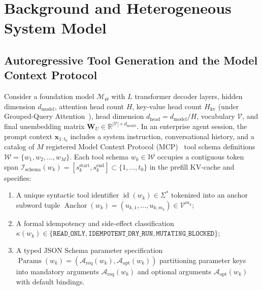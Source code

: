 \documentclass[10pt,conference]{IEEEtran}
\begin{document}
\section{Background and Heterogeneous System Model}
\label{sec:background}

\subsection{Autoregressive Tool Generation and the Model Context Protocol}
Consider a foundation model $\mathcal{M}_\Theta$ with $L$ transformer decoder layers, hidden dimension $d_{\text{model}}$, attention head count $H$, key-value head count $H_{\text{kv}}$ (under Grouped-Query Attention~\cite{vaswani2017attention, dao2022flashattention, dao2024flashattention2}), head dimension $d_{\text{head}} = d_{\text{model}} / H$, vocabulary $\mathcal{V}$, and final unembedding matrix $\mathbf{W}_U \in \mathbb{R}^{|\mathcal{V}| \times d_{\text{model}}}$. In an enterprise agent session, the prompt context $\mathbf{x}_{1:t_0}$ includes a system instruction, conversational history, and a catalog of $M$ registered Model Context Protocol (MCP)~\cite{anthropic2024mcp, lumer2025scalemcp, gan2025ragmcp} tool schema definitions $\mathcal{W} = \{w_1, w_2, \dots, w_M\}$. Each tool schema $w_k \in \mathcal{W}$ occupies a contiguous token span $\mathcal{I}_{\text{schema}}(w_k) = [s_k^{\text{start}}, s_k^{\text{end}}] \subset \{1, \dots, t_0\}$ in the prefill KV-cache and specifies:
\begin{enumerate}
    \item A unique syntactic tool identifier $\operatorname{id}(w_k) \in \Sigma^*$ tokenized into an anchor subword tuple $\operatorname{Anchor}(w_k) = (u_{k,1}, \dots, u_{k,m_k}) \in \mathcal{V}^{m_k}$;
    \item A formal idempotency and side-effect classification $\kappa(w_k) \in \{\texttt{READ\_ONLY},\allowbreak \texttt{IDEMPOTENT\_DRY\_RUN},\allowbreak \texttt{MUTATING\_BLOCKED}\}$;
    \item A typed JSON Schema parameter specification $\operatorname{Params}(w_k) = (\mathcal{A}_{\text{req}}(w_k), \mathcal{A}_{\text{opt}}(w_k))$ partitioning parameter keys into mandatory arguments $\mathcal{A}_{\text{req}}(w_k)$ and optional arguments $\mathcal{A}_{\text{opt}}(w_k)$ with default bindings.
\end{enumerate}
\end{document}
